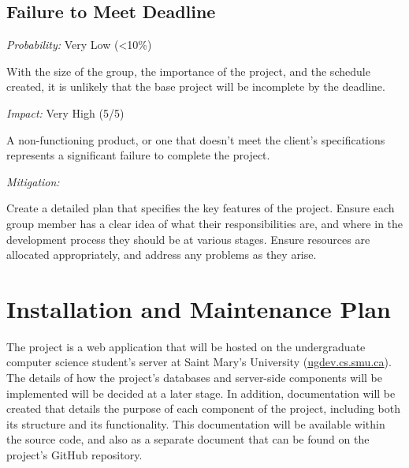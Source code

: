 \documentclass[11pt]{article}
\begin{document}
\subsection{Failure to Meet Deadline}
\textit{Probability:} Very Low (\textless10\%) \begin{addmargin}[1em]{2em} With the size of the
group, the importance of the project, and the schedule created, it is unlikely that the base project
will be incomplete by the deadline.\end{addmargin}\vspace{2mm}
\noindent \textit{Impact:} Very High (5/5) \begin{addmargin}[1em]{2em} A non-functioning product, or
one that doesn't meet the client's specifications represents a significant failure to complete the
project. \end{addmargin}\vspace{2mm}
\noindent \textit{Mitigation:} \begin{addmargin}[1em]{2em} Create a detailed plan that specifies the
key features of the project. Ensure each group member has a clear idea of what their
responsibilities are, and where in the development process they should be at various stages.
Ensure resources are allocated appropriately, and address any problems as they
arise.\end{addmargin}

\section{Installation and Maintenance Plan}

The project is a web application that will be hosted on the undergraduate computer science student's
server at Saint Mary's University (\url{ugdev.cs.smu.ca}). The details of how the project's
databases and server-side components will be implemented will be decided at a later stage.
In addition, documentation will be created that details the purpose of each component of the
project, including both its structure and its functionality. This documentation will be available
within the source code, and also as a separate document that can be found on the project's GitHub
repository.
\end{document}
